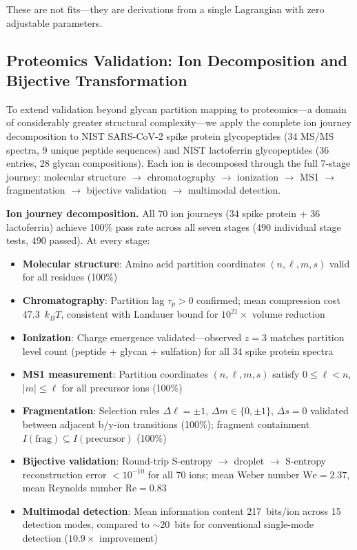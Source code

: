 \documentclass[twocolumn,10pt,a4paper]{article}
\theoremstyle{definition}
\theoremstyle{remark}
\begin{document}
These are not fits---they are derivations from a single Lagrangian with zero adjustable parameters.

\subsection{Proteomics Validation: Ion Decomposition and Bijective Transformation}
\label{sec:proteomics}

To extend validation beyond glycan partition mapping to proteomics---a domain of considerably greater structural complexity---we apply the complete ion journey decomposition to NIST SARS-CoV-2 spike protein glycopeptides (34 MS/MS spectra, 9 unique peptide sequences) and NIST lactoferrin glycopeptides (36 entries, 28 glycan compositions). Each ion is decomposed through the full 7-stage journey: molecular structure $\to$ chromatography $\to$ ionization $\to$ MS1 $\to$ fragmentation $\to$ bijective validation $\to$ multimodal detection.

\textbf{Ion journey decomposition.} All 70 ion journeys (34 spike protein + 36 lactoferrin) achieve 100\% pass rate across all seven stages (490 individual stage tests, 490 passed). At every stage:
\begin{itemize}[nosep]
    \item \textbf{Molecular structure}: Amino acid partition coordinates $(n, \ell, m, s)$ valid for all residues (100\%)
    \item \textbf{Chromatography}: Partition lag $\tau_p > 0$ confirmed; mean compression cost 47.3~$k_BT$, consistent with Landauer bound for $10^{21}\times$ volume reduction
    \item \textbf{Ionization}: Charge emergence validated---observed $z = 3$ matches partition level count (peptide + glycan + sulfation) for all 34 spike protein spectra
    \item \textbf{MS1 measurement}: Partition coordinates $(n, \ell, m, s)$ satisfy $0 \leq \ell < n$, $|m| \leq \ell$ for all precursor ions (100\%)
    \item \textbf{Fragmentation}: Selection rules $\Delta\ell = \pm 1$, $\Delta m \in \{0, \pm 1\}$, $\Delta s = 0$ validated between adjacent b/y-ion transitions (100\%); fragment containment $I(\text{frag}) \subseteq I(\text{precursor})$ (100\%)
    \item \textbf{Bijective validation}: Round-trip S-entropy $\to$ droplet $\to$ S-entropy reconstruction error $< 10^{-10}$ for all 70 ions; mean Weber number $\text{We} = 2.37$, mean Reynolds number $\text{Re} = 0.83$
    \item \textbf{Multimodal detection}: Mean information content 217~bits/ion across 15 detection modes, compared to $\sim 20$~bits for conventional single-mode detection ($10.9\times$ improvement)
\end{itemize}
\end{document}
